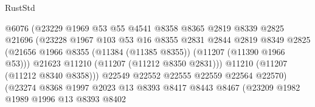 \begin{lexlean}{RustStd}
\begin{coremodule}
                                      @6076
                                      (@23229
                                        @1969
                                        @53
                                        @55
                                        @4541
                                        @8358
                                        @8365
                                        @2819
                                        @8339
                                        @2825
                                        @21696
                                        (@23228
                                          @1967
                                          @103
                                          @53
                                          @16
                                          @8355
                                          @2831
                                          @2844
                                          @2819
                                          @8349
                                          @2825
                                          (@21656
                                            @1966
                                            @8355
                                            (@11384 (@11385 @8355))
                                            (@11207 (@11390 @1966 @53)))
                                          @21623
                                          @11210
                                          (@11207 (@11212 @8350 @2831)))
                                        @11210
                                        (@11207 (@11212 @8340 @8358)))
                                      @22549
                                      @22552
                                      @22555
                                      @22559
                                      @22564
                                      @22570)
                                    (@23274
                                      @8368
                                      @1997
                                      @2023
                                      @13
                                      @8393
                                      @8417
                                      @8443
                                      @8467
                                      (@23209
                                        @1982
                                        @1989
                                        @1996
                                        @13
                                        @8393
                                        @8402

\end{coremodule}
\end{lexlean}

